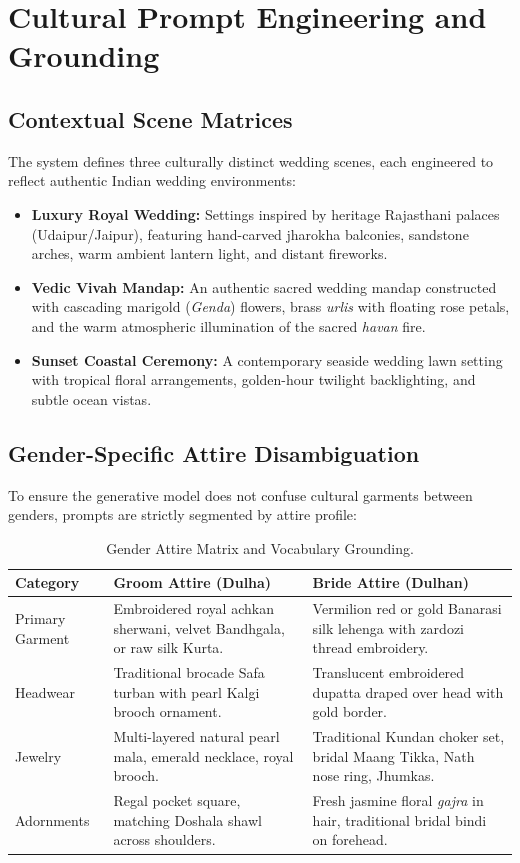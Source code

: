 \documentclass[11pt,a4paper]{article}
\begin{document}
\section{Cultural Prompt Engineering and Grounding}

\subsection{Contextual Scene Matrices}
The system defines three culturally distinct wedding scenes, each engineered to reflect authentic Indian wedding environments:
\begin{itemize}[leftmargin=*]
    \item \textbf{Luxury Royal Wedding:} Settings inspired by heritage Rajasthani palaces (Udaipur/Jaipur), featuring hand-carved jharokha balconies, sandstone arches, warm ambient lantern light, and distant fireworks.
    \item \textbf{Vedic Vivah Mandap:} An authentic sacred wedding mandap constructed with cascading marigold (\textit{Genda}) flowers, brass \textit{urlis} with floating rose petals, and the warm atmospheric illumination of the sacred \textit{havan} fire.
    \item \textbf{Sunset Coastal Ceremony:} A contemporary seaside wedding lawn setting with tropical floral arrangements, golden-hour twilight backlighting, and subtle ocean vistas.
\end{itemize}

\subsection{Gender-Specific Attire Disambiguation}
To ensure the generative model does not confuse cultural garments between genders, prompts are strictly segmented by attire profile:

\begin{table}[htbp]
\centering
\caption{Gender Attire Matrix and Vocabulary Grounding.}
\label{tab:attire}
\begin{tabularx}{\textwidth}{lXX}
\toprule
\textbf{Category} & \textbf{Groom Attire (Dulha)} & \textbf{Bride Attire (Dulhan)} \\
\midrule
Primary Garment & Embroidered royal achkan sherwani, velvet Bandhgala, or raw silk Kurta. & Vermilion red or gold Banarasi silk lehenga with zardozi thread embroidery. \\
Headwear & Traditional brocade Safa turban with pearl Kalgi brooch ornament. & Translucent embroidered dupatta draped over head with gold border. \\
Jewelry & Multi-layered natural pearl mala, emerald necklace, royal brooch. & Traditional Kundan choker set, bridal Maang Tikka, Nath nose ring, Jhumkas. \\
Adornments & Regal pocket square, matching Doshala shawl across shoulders. & Fresh jasmine floral \textit{gajra} in hair, traditional bridal bindi on forehead. \\
\bottomrule
\end{tabularx}
\end{table}
\end{document}
